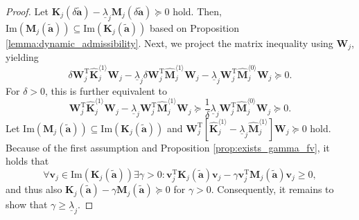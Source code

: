 \documentclass[final,onefignum,onetabnum]{siamart220329}
\newtheorem*{proof}{Proof}%
\begin{document}
\begin{proof}
\fbox{$\Rightarrow$} Let $\mathbf{K}_j(\delta \tilde{\mathbf{a}}) - \underline{\lambda}_j \mathbf{M}_j(\delta \tilde{\mathbf{a}}) \succeq 0$ hold. Then, $\mathrm{Im}\left(\mathbf{M}_j(\tilde{\mathbf{a}})\right) \subseteq \mathrm{Im}\left(\mathbf{K}_j(\tilde{\mathbf{a}})\right)$ based on Proposition \ref{lemma:dynamic_admissibility}. Next, we project the matrix inequality using $\mathbf{W}_j$, yielding
%
\begin{equation}
	\delta \mathbf{W}_{{j}}^\mathrm{T} \hat{\mathbf{K}}_j^{\langle 1\rangle} \mathbf{W}_j- \underline{\lambda}_j \delta \mathbf{W}_{{j}}^\mathrm{T} \hat{\mathbf{M}}_j^{\langle 1\rangle} \mathbf{W}_j - \underline{\lambda}_j\mathbf{W}_{{j}}^\mathrm{T} \hat{\mathbf{M}}_j^{\langle 0\rangle} \mathbf{W}_j \succeq 0.
\end{equation}
%
For $\delta>0$, this is further equivalent to
%
\begin{equation}
	\mathbf{W}_{{j}}^\mathrm{T} \hat{\mathbf{K}}_j^{\langle 1\rangle} \mathbf{W}_j- \underline{\lambda}_j \mathbf{W}_{{j}}^\mathrm{T} \hat{\mathbf{M}}_j^{\langle 1\rangle} \mathbf{W}_j \succeq \frac{1}{\delta}\underline{\lambda}_j\mathbf{W}_{{j}}^\mathrm{T} \hat{\mathbf{M}}_j^{\langle 0\rangle} \mathbf{W}_j \succeq 0.
\end{equation}
%
\fbox{$\Leftarrow$} Let $\mathrm{Im}\left(\mathbf{M}_j(\tilde{\mathbf{a}})\right) \subseteq \mathrm{Im}\left(\mathbf{K}_j(\tilde{\mathbf{a}})\right)$ and $\mathbf{W}_j^\mathrm{T}\left[\hat{\mathbf{K}}_{j}^{\langle 1\rangle} - \underline{\lambda}_j \hat{\mathbf{M}}_{j}^{\langle 1\rangle} \right]\mathbf{W}_j \succeq 0$ hold. Because of the first assumption and Proposition \ref{prop:exists_gamma_fv}, it holds that
%
\begin{equation}
\forall \mathbf{v}_j \in \mathrm{Im}\left(\mathbf{K}_j(\tilde{\mathbf{a}})\right) \exists \gamma>0: \mathbf{v}_j^\mathrm{T}\mathbf{K}_j(\tilde{\mathbf{a}})\mathbf{v}_j - \gamma\mathbf{v}_j^\mathrm{T}\mathbf{M}_j(\tilde{\mathbf{a}})\mathbf{v}_j \ge 0,
\end{equation}
%
and thus also $\mathbf{K}_j(\tilde{\mathbf{a}}) - \gamma\mathbf{M}_j(\tilde{\mathbf{a}}) \succeq 0$ for $\gamma > 0$. Consequently, it remains to show that $\gamma\ge \underline{\lambda}_j$.


\end{proof}
\end{document}
